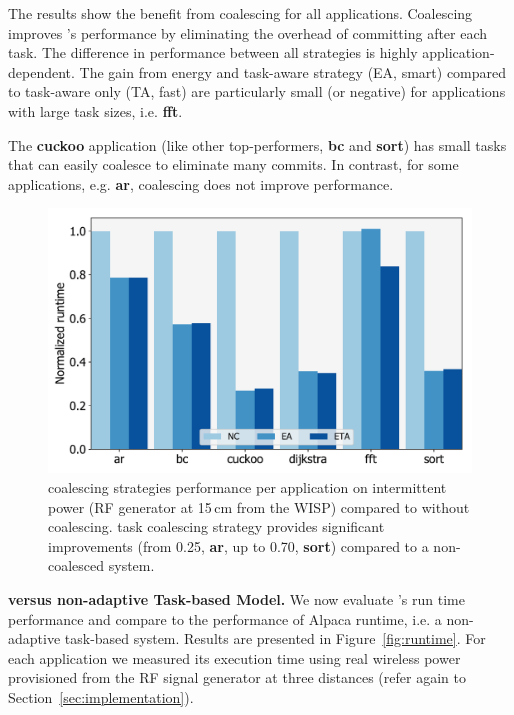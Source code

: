 The results show the benefit from coalescing for all applications. Coalescing improves \sys's performance by eliminating the overhead of committing after each task. The difference in performance between all strategies is highly application-dependent. The gain from energy and task-aware strategy (EA, smart) compared to task-aware only (TA, fast) are particularly small (or negative) for applications with large task sizes, i.e. \textbf{fft}. 

The \textbf{cuckoo} application (like other top-performers, \textbf{bc} and \textbf{sort}) has small tasks that \sys can easily coalesce to eliminate many commits. In contrast, for some applications, e.g. \textbf{ar}, coalescing does not improve performance. 


\begin{figure}
	\centering
	\includegraphics[width=0.5\columnwidth]{figures/coalStrategies}
	\caption{\sys coalescing strategies performance per application on intermittent power (RF generator at 15\,cm from the WISP) compared to \sys without coalescing. \sys task coalescing strategy provides significant improvements (from 0.25, \textbf{ar}, up to 0.70, \textbf{sort}) compared to a non-coalesced system.}
	\label{fig:coalescing}
\end{figure}

\textbf{\sys versus non-adaptive Task-based Model.} We now evaluate \sys's run time performance and compare \sys to the performance of Alpaca runtime, i.e. a non-adaptive task-based system. Results are presented in Figure~\ref{fig:runtime}. For each application we measured its execution time using real wireless power provisioned from the RF signal generator at three distances (refer again to Section~\ref{sec:implementation}).

